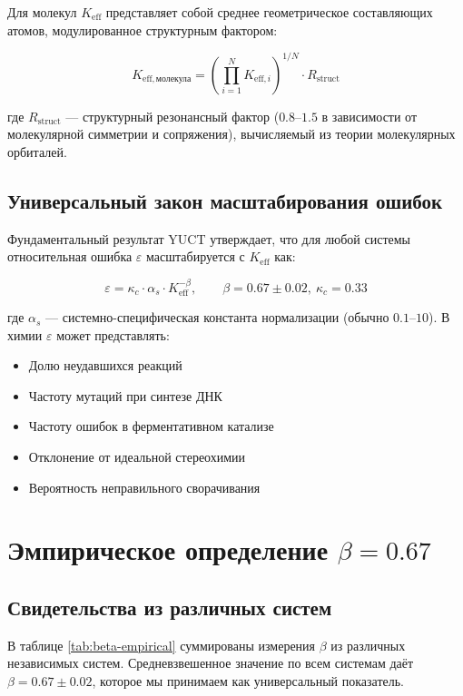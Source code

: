 \documentclass[12pt,a4paper]{article}
\theoremstyle{remark}
\newcommand{\Keff}{K_{\mathrm{eff}}}
\newcommand{\kappac}{\kappa_c}
\newcommand{\eps}{\varepsilon}
\newcommand{\Rstruct}{R_{\mathrm{struct}}}
\begin{document}
	Для молекул $\Keff$ представляет собой среднее геометрическое составляющих атомов, модулированное структурным фактором:
	
	\begin{equation}
		K_{\mathrm{eff},\text{молекула}} = \left(\prod_{i=1}^{N} K_{\mathrm{eff},i}\right)^{1/N} \cdot \Rstruct
		\label{eq:keff-molecule}
	\end{equation}
	
	где $\Rstruct$ — структурный резонансный фактор ($0.8$--$1.5$ в зависимости от молекулярной симметрии и сопряжения), вычисляемый из теории молекулярных орбиталей.
	
	\subsection{Универсальный закон масштабирования ошибок}
	
	Фундаментальный результат YUCT утверждает, что для любой системы относительная ошибка $\eps$ масштабируется с $\Keff$ как:
	
	\begin{equation}
		\boxed{\eps = \kappac \cdot \alpha_s \cdot \Keff^{-\beta}, \qquad \beta = 0.67 \pm 0.02, \ \kappac = 0.33}
		\label{eq:universal-error}
	\end{equation}
	
	где $\alpha_s$ — системно-специфическая константа нормализации (обычно $0.1$--$10$). В химии $\eps$ может представлять:
	\begin{itemize}
		\item Долю неудавшихся реакций
		\item Частоту мутаций при синтезе ДНК
		\item Частоту ошибок в ферментативном катализе
		\item Отклонение от идеальной стереохимии
		\item Вероятность неправильного сворачивания
	\end{itemize}
	
	\section{Эмпирическое определение $\beta = 0.67$}
	\label{sec:empirical-beta}
	
	\subsection{Свидетельства из различных систем}
	
	В таблице \ref{tab:beta-empirical} суммированы измерения $\beta$ из различных независимых систем. Средневзвешенное значение по всем системам даёт $\beta = 0.67 \pm 0.02$, которое мы принимаем как универсальный показатель.
	
\end{document}
